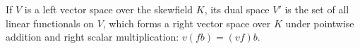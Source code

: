 If $V$ is a left vector space over the skewfield $K$, its dual space $V'$ is the set of all linear functionals on $V$, which forms a right vector space over $K$ under pointwise addition and right scalar multiplication: $v(fb) = (vf)b$.

